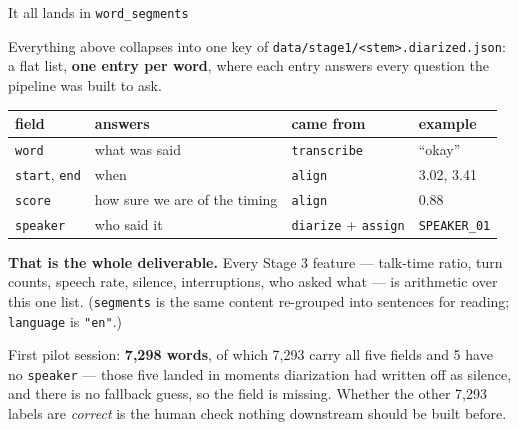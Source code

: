 \documentclass[aspectratio=169]{beamer}
\begin{document}
\begin{frame}{It all lands in \texttt{word\_segments}}

Everything above collapses into one key of
\texttt{data/stage1/<stem>.diarized.json}: a flat list, \textbf{one entry per word}, where
each entry answers every question the pipeline was built to ask.

\begin{center}
\small
\begin{tabular}{llll}
\toprule
\textbf{field} & \textbf{answers} & \textbf{came from} & \textbf{example} \\
\midrule
\texttt{word} & what was said & \texttt{transcribe} & ``okay'' \\
\texttt{start}, \texttt{end} & when & \texttt{align} & 3.02, 3.41 \\
\texttt{score} & how sure we are of the timing & \texttt{align} & 0.88 \\
\texttt{speaker} & who said it & \texttt{diarize} + \texttt{assign} & \texttt{SPEAKER\_01} \\
\bottomrule
\end{tabular}
\end{center}

\vspace{0.35em}
\textbf{That is the whole deliverable.} Every Stage 3 feature --- talk-time ratio, turn
counts, speech rate, silence, interruptions, who asked what --- is arithmetic over this one
list. (\texttt{segments} is the same content re-grouped into sentences for reading;
\texttt{language} is \texttt{"en"}.)

\vspace{0.5em}
First pilot session: \textbf{7{,}298 words}, of which 7{,}293 carry all five fields and 5
have no \texttt{speaker} --- those five landed in moments diarization had written off as
silence, and there is no fallback guess, so the field is missing. Whether the other 7{,}293
labels are \emph{correct} is the human check nothing downstream should be built before.

\end{frame}
\end{document}
